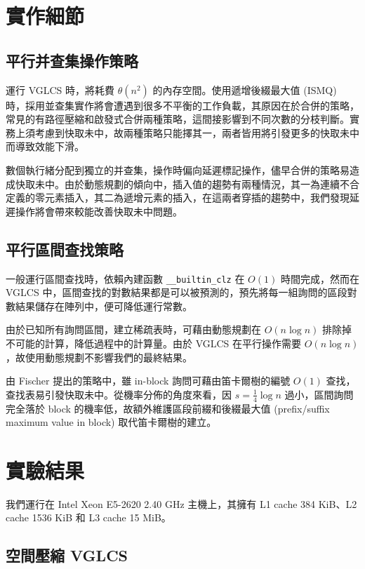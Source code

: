 \documentclass{gapd}
\begin{document}
\section{實作細節}
\label{sec:Implementation}

\subsection{平行并查集操作策略}

運行 VGLCS 時，將耗費 $\theta(n^2)$ 的內存空間。使用遞增後綴最大值 (ISMQ) 時，採用並查集實作將會遭遇到很多不平衡的工作負載，其原因在於合併的策略，常見的有路徑壓縮和啟發式合併兩種策略，這間接影響到不同次數的分枝判斷。實務上須考慮到快取未中，故兩種策略只能擇其一，兩者皆用將引發更多的快取未中而導致效能下滑。

數個執行緒分配到獨立的并查集，操作時偏向延遲標記操作，儘早合併的策略易造成快取未中。由於動態規劃的傾向中，插入值的趨勢有兩種情況，其一為連續不合定義的零元素插入，其二為遞增元素的插入，在這兩者穿插的趨勢中，我們發現延遲操作將會帶來較能改善快取未中問題。

\subsection{平行區間查找策略}

一般運行區間查找時，依賴內建函數 \texttt{\_\_builtin\_clz} 在 $O(1)$ 時間完成，然而在 VGLCS 中，區間查找的對數結果都是可以被預測的，預先將每一組詢問的區段對數結果儲存在陣列中，便可降低運行常數。

由於已知所有詢問區間，建立稀疏表時，可藉由動態規劃在 $O(n \log n)$ 排除掉不可能的計算，降低過程中的計算量。由於 VGLCS 在平行操作需要 $O(n \log n)$，故使用動態規劃不影響我們的最終結果。

由 Fischer \cite{fischer} 提出的策略中，雖 in-block 詢問可藉由笛卡爾樹的編號 $O(1)$ 查找，查找表易引發快取未中。從機率分佈的角度來看，因 $s = \frac{1}{4} \log n$ 過小，區間詢問完全落於 block 的機率低，故額外維護區段前綴和後綴最大值 (prefix/suffix maximum value in block) 取代笛卡爾樹的建立。

\section{實驗結果}
\label{sec:Experiment}

我們運行在 Intel Xeon E5-2620 2.40 GHz 主機上，其擁有 L1 cache 384 KiB、L2 cache 1536 KiB 和 L3 cache 15 MiB。

\subsection{空間壓縮 VGLCS}
\end{document}
